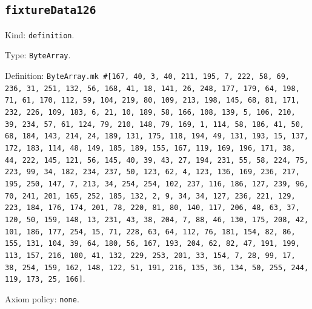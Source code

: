 \documentclass[11pt]{article}
\begin{document}
\subsection*{\texttt{fixtureData126}}
\noindent Kind: \texttt{definition}.\par
\noindent Type: \texttt{ByteArray}.\par
\noindent Definition: \texttt{ByteArray.mk \#[167, 40, 3, 40, 211, 195, 7, 222, 58, 69, 236, 31, 251, 132, 56, 168, 41, 18, 141, 26, 248, 177, 179, 64, 198, 71, 61, 170, 112, 59, 104, 219, 80, 109, 213, 198, 145, 68, 81, 171, 232, 226, 109, 183, 6, 21, 10, 189, 58, 166, 108, 139, 5, 106, 210, 39, 234, 57, 61, 124, 79, 210, 148, 79, 169, 1, 114, 58, 186, 41, 50, 68, 184, 143, 214, 24, 189, 131, 175, 118, 194, 49, 131, 193, 15, 137, 172, 183, 114, 48, 149, 185, 189, 155, 167, 119, 169, 196, 171, 38, 44, 222, 145, 121, 56, 145, 40, 39, 43, 27, 194, 231, 55, 58, 224, 75, 223, 99, 34, 182, 234, 237, 50, 123, 62, 4, 123, 136, 169, 236, 217, 195, 250, 147, 7, 213, 34, 254, 254, 102, 237, 116, 186, 127, 239, 96, 70, 241, 201, 165, 252, 185, 132, 2, 9, 34, 34, 127, 236, 221, 129, 223, 184, 176, 174, 201, 78, 220, 81, 80, 140, 117, 206, 48, 63, 37, 120, 50, 159, 148, 13, 231, 43, 38, 204, 7, 88, 46, 130, 175, 208, 42, 101, 186, 177, 254, 15, 71, 228, 63, 64, 112, 76, 181, 154, 82, 86, 155, 131, 104, 39, 64, 180, 56, 167, 193, 204, 62, 82, 47, 191, 199, 113, 157, 216, 100, 41, 132, 229, 253, 201, 33, 154, 7, 28, 99, 17, 38, 254, 159, 162, 148, 122, 51, 191, 216, 135, 36, 134, 50, 255, 244, 119, 173, 25, 166]}.\par
\noindent Axiom policy: \texttt{none}.\par
\end{document}
